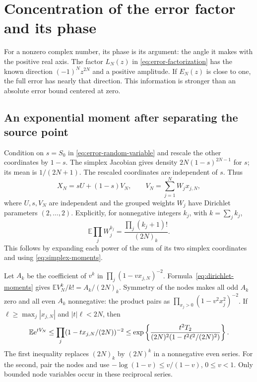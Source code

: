 \section{Concentration of the error factor and its phase}
\label{sec:phase}

For a nonzero complex number, its phase is its argument: the angle
it makes with the positive real axis. The factor \(L_N(z)\) in
\eqref{eq:error-factorization} has the known direction
\((-1)^Nz^{2N}\) and a positive amplitude. If \(E_N(z)\) is close
to one, the full error has nearly that direction. This information
is stronger than an absolute error bound centered at zero.

\subsection{An exponential moment after separating the source point}

Condition on \(s=S_0\) in \eqref{eq:error-random-variable} and
rescale the other coordinates by \(1-s\). The simplex Jacobian
gives density \(2N(1-s)^{2N-1}\) for \(s\); its mean is
\(1/(2N+1)\). The rescaled coordinates are independent of \(s\).
Thus
\begin{equation}
 X_N=sU+(1-s)V_N,\qquad V_N=\sum_{j=1}^NW_jx_{j,N},
 \label{eq:beta-split}
\end{equation}
where \(U,s,V_N\) are independent and the grouped weights \(W_j\)
have Dirichlet parameters \((2,\ldots,2)\). Explicitly, for
nonnegative integers \(k_j\), with \(k=\sum_jk_j\),
\begin{equation}
 \mathbb E\prod_jW_j^{k_j}=\frac{\prod_j(k_j+1)!}{(2N)_k}.
 \label{eq:dirichlet-moments}
\end{equation}
This follows by expanding each power of the sum of its two simplex
coordinates and using \eqref{eq:simplex-moments}.

Let \(A_k\) be the coefficient of \(v^k\) in
\(\prod_j(1-vx_{j,N})^{-2}\). Formula~\eqref{eq:dirichlet-moments}
gives \(\mathbb E V_N^k/k!=A_k/(2N)_k\). Symmetry of the nodes
makes all odd \(A_k\) zero and all even \(A_k\) nonnegative:
the product pairs as \(\prod_{x_j>0}(1-v^2x_j^2)^{-2}\).
If \(\ell\ge\max_j|x_{j,N}|\) and \(|t|\ell<2N\), then
\begin{equation}
 \mathbb E\mathrm e^{tV_N}
 \le\prod_j(1-tx_{j,N}/(2N))^{-2}
 \le\exp\left\{\frac{t^2T_2}
 {(2N)^2(1-t^2\ell^2/(2N)^2)}\right\}.
 \label{eq:node-exponential}
\end{equation}
The first inequality replaces \((2N)_k\) by \((2N)^k\) in
a nonnegative even series. For the second, pair the nodes and use
\(-\log(1-v)\le v/(1-v)\), \(0\le v<1\). Only bounded node
variables occur in these reciprocal series.

